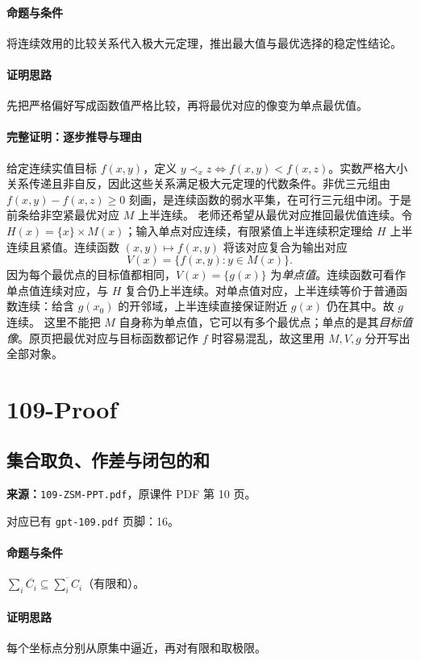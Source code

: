 \paragraph{命题与条件}将连续效用的比较关系代入极大元定理，推出最大值与最优选择的稳定性结论。
\paragraph{证明思路}先把严格偏好写成函数值严格比较，再将最优对应的像变为单点最优值。
\paragraph{完整证明：逐步推导与理由}

给定连续实值目标 $f(x,y)$，定义 $y\prec_x z\iff f(x,y)<f(x,z)$。实数严格大小关系传递且非自反，因此这些关系满足极大元定理的代数条件。非优三元组由 $f(x,y)-f(x,z)\ge0$ 刻画，是连续函数的弱水平集，在可行三元组中闭。于是前条给非空紧最优对应 $M$ 上半连续。
老师还希望从最优对应推回最优值连续。令 $H(x)=\{x\}\times M(x)$；输入单点对应连续，有限紧值上半连续积定理给 $H$ 上半连续且紧值。连续函数 $(x,y)\mapsto f(x,y)$ 将该对应复合为输出对应
\[V(x)=\{f(x,y):y\in M(x)\}.\]
因为每个最优点的目标值都相同，$V(x)=\{g(x)\}$ 为\emph{单点值}。连续函数可看作单点值连续对应，与 $H$ 复合仍上半连续。对单点值对应，上半连续等价于普通函数连续：给含 $g(x_0)$ 的开邻域，上半连续直接保证附近 $g(x)$ 仍在其中。故 $g$ 连续。
这里不能把 $M$ 自身称为单点值，它可以有多个最优点；单点的是其\emph{目标值像}。原页把最优对应与目标函数都记作 $f$ 时容易混乱，故这里用 $M,V,g$ 分开写出全部对象。

\clearpage\section{109-Proof}
\clearpage\subsection{集合取负、作差与闭包的和}
\textbf{来源：}\texttt{109-ZSM-PPT.pdf}，原课件 PDF 第 10 页。\par
对应已有 \texttt{gpt-109.pdf} 页脚：16。\par
\paragraph{命题与条件}$\sum_i\overline{C_i}\subseteq\overline{\sum_i C_i}$（有限和）。
\paragraph{证明思路}每个坐标点分别从原集中逼近，再对有限和取极限。
